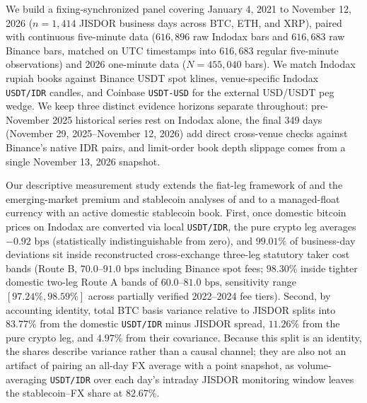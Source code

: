 We build a fixing-synchronized panel covering January 4, 2021 to November 12, 2026 ($n = 1,414$ JISDOR business days across BTC, ETH, and XRP), paired with continuous five-minute data ($616,896$ raw Indodax bars and $616,683$ raw Binance bars, matched on UTC timestamps into $616,683$ regular five-minute observations) and 2026 one-minute data ($N = 455,040$ bars). We match Indodax rupiah books against Binance USDT spot klines, venue-specific Indodax \texttt{USDT/IDR} candles, and Coinbase \texttt{USDT-USD} for the external USD/USDT peg wedge. We keep three distinct evidence horizons separate throughout: pre-November 2025 historical series rest on Indodax alone, the final 349 days (November 29, 2025--November 12, 2026) add direct cross-venue checks against Binance's native IDR pairs, and limit-order book depth slippage comes from a single November 13, 2026 snapshot.

Our descriptive measurement study extends the fiat-leg framework of \citet{makarov2020trading} and the emerging-market premium and stablecoin analyses of \citet{lee2022kimchi} and \citet{lyons2023stablecoins} to a managed-float currency with an active domestic stablecoin book. First, once domestic bitcoin prices on Indodax are converted via local \texttt{USDT/IDR}, the pure crypto leg averages $-0.92\text{ bps}$ (statistically indistinguishable from zero), and $99.01\%$ of business-day deviations sit inside reconstructed cross-exchange three-leg statutory taker cost bands (Route B, $70.0$--$91.0\text{ bps}$ including Binance spot fees; $98.30\%$ inside tighter domestic two-leg Route A bands of $60.0$--$81.0\text{ bps}$, sensitivity range $[97.24\%, 98.59\%]$ across partially verified 2022--2024 fee tiers). Second, by accounting identity, total BTC basis variance relative to JISDOR splits into $83.77\%$ from the domestic \texttt{USDT/IDR} minus JISDOR spread, $11.26\%$ from the pure crypto leg, and $4.97\%$ from their covariance. Because this split is an identity, the shares describe variance rather than a causal channel; they are also not an artifact of pairing an all-day FX average with a point snapshot, as volume-averaging \texttt{USDT/IDR} over each day's intraday JISDOR monitoring window leaves the stablecoin--FX share at $82.67\%$.

